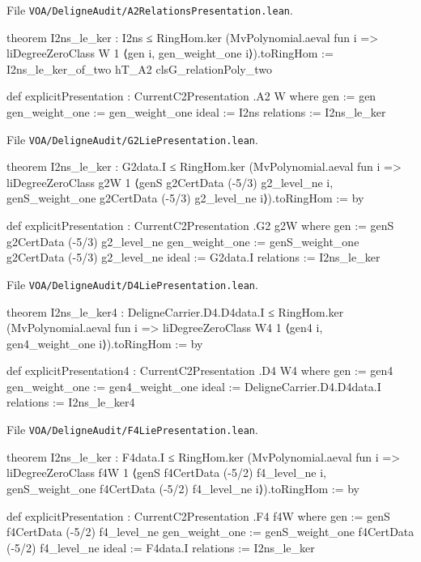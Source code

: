 \documentclass[11pt,openany]{book}
\newcommand{\leanpath}[1]{\texttt{\small #1}}
\theoremstyle{definition}
\theoremstyle{plain}
\begin{document}
{\raggedright\noindent File \leanpath{VOA/\allowbreak DeligneAudit/\allowbreak A2RelationsPresentation.lean}.\par}
\begin{leancode}
theorem I2ns_le_ker : I2ns ≤ RingHom.ker
    (MvPolynomial.aeval fun i =>
      liDegreeZeroClass W 1 ⟨gen i, gen_weight_one i⟩).toRingHom :=
  I2ns_le_ker_of_two hT_A2 clsG_relationPoly_two

def explicitPresentation : CurrentC2Presentation .A2 W where
  gen := gen
  gen_weight_one := gen_weight_one
  ideal := I2ns
  relations := I2ns_le_ker
\end{leancode}
{\raggedright\noindent File \leanpath{VOA/\allowbreak DeligneAudit/\allowbreak G2LiePresentation.lean}.\par}
\begin{leancode}
theorem I2ns_le_ker : G2data.I ≤ RingHom.ker
    (MvPolynomial.aeval fun i =>
      liDegreeZeroClass g2W 1 ⟨genS g2CertData (-5/3) g2_level_ne i,
        genS_weight_one g2CertData (-5/3) g2_level_ne i⟩).toRingHom := by

def explicitPresentation : CurrentC2Presentation .G2 g2W where
  gen := genS g2CertData (-5/3) g2_level_ne
  gen_weight_one := genS_weight_one g2CertData (-5/3) g2_level_ne
  ideal := G2data.I
  relations := I2ns_le_ker
\end{leancode}
{\raggedright\noindent File \leanpath{VOA/\allowbreak DeligneAudit/\allowbreak D4LiePresentation.lean}.\par}
\begin{leancode}
theorem I2ns_le_ker4 : DeligneCarrier.D4.D4data.I ≤ RingHom.ker
    (MvPolynomial.aeval fun i => liDegreeZeroClass W4 1 ⟨gen4 i, gen4_weight_one i⟩).toRingHom := by

def explicitPresentation4 : CurrentC2Presentation .D4 W4 where
  gen := gen4
  gen_weight_one := gen4_weight_one
  ideal := DeligneCarrier.D4.D4data.I
  relations := I2ns_le_ker4
\end{leancode}
{\raggedright\noindent File \leanpath{VOA/\allowbreak DeligneAudit/\allowbreak F4LiePresentation.lean}.\par}
\begin{leancode}
theorem I2ns_le_ker : F4data.I ≤ RingHom.ker
    (MvPolynomial.aeval fun i =>
      liDegreeZeroClass f4W 1 ⟨genS f4CertData (-5/2) f4_level_ne i,
        genS_weight_one f4CertData (-5/2) f4_level_ne i⟩).toRingHom := by

def explicitPresentation : CurrentC2Presentation .F4 f4W where
  gen := genS f4CertData (-5/2) f4_level_ne
  gen_weight_one := genS_weight_one f4CertData (-5/2) f4_level_ne
  ideal := F4data.I
  relations := I2ns_le_ker
\end{leancode}
\end{document}
